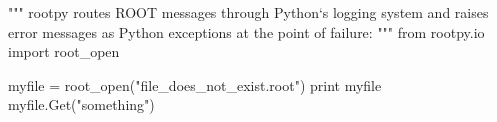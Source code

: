 \begin{footnotesize}
\begin{pyglist}[language=python,texcl=true,abovecaptionskip=0,style=vs,bgcolor=Moccasin]
"""
rootpy routes ROOT messages through Python`s logging system and raises error
messages as Python exceptions at the point of failure:
"""
from rootpy.io import root_open

myfile = root_open("file_does_not_exist.root")
print myfile
myfile.Get("something")
\end{pyglist}
\end{footnotesize}

